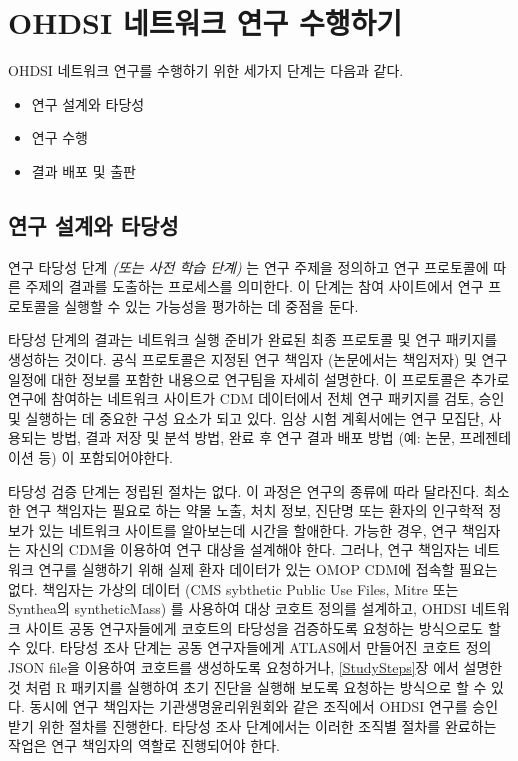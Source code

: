 \documentclass[11pt]{book}
\providecommand{\tightlist}{%
  \setlength{\itemsep}{0pt}\setlength{\parskip}{0pt}}
\theoremstyle{definition}
\theoremstyle{definition}
\theoremstyle{definition}
\theoremstyle{remark}
\begin{document}
\section{OHDSI 네트워크 연구 수행하기}\label{ohdsi---}


OHDSI 네트워크 연구를 수행하기 위한 세가지 단계는 다음과 같다.

\begin{itemize}
\tightlist
\item
  연구 설계와 타당성
\item
  연구 수행
\item
  결과 배포 및 출판
\end{itemize}

\subsection{연구 설계와 타당성}\label{--}

연구 타당성 단계 \emph{(또는 사전 학습 단계)} 는 연구 주제을 정의하고
연구 프로토콜에 따른 주제의 결과를 도출하는 프로세스를 의미한다. 이
단계는 참여 사이트에서 연구 프로토콜을 실행할 수 있는 가능성을 평가하는
데 중점을 둔다.

타당성 단계의 결과는 네트워크 실행 준비가 완료된 최종 프로토콜 및 연구
패키지를 생성하는 것이다. 공식 프로토콜은 지정된 연구 책임자 (논문에서는
책임저자) 및 연구 일정에 대한 정보를 포함한 내용으로 연구팀을 자세히
설명한다. 이 프로토콜은 추가로 연구에 참여하는 네트워크 사이트가 CDM
데이터에서 전체 연구 패키지를 검토, 승인 및 실행하는 데 중요한 구성
요소가 되고 있다. 임상 시험 계획서에는 연구 모집단, 사용되는 방법, 결과
저장 및 분석 방법, 완료 후 연구 결과 배포 방법 (예: 논문, 프레젠테이션
등) 이 포함되어야한다.

타당성 검증 단계는 정립된 절차는 없다. 이 과정은 연구의 종류에 따라
달라진다. 최소한 연구 책임자는 필요로 하는 약물 노출, 처치 정보, 진단명
또는 환자의 인구학적 정보가 있는 네트워크 사이트를 알아보는데 시간을
할애한다. 가능한 경우, 연구 책임자는 자신의 CDM을 이용하여 연구 대상을
설계해야 한다. 그러나, 연구 책임자는 네트워크 연구를 실행하기 위해 실제
환자 데이터가 있는 OMOP CDM에 접속할 필요는 없다. 책임자는 가상의 데이터
(CMS sybthetic Public Use Files, Mitre 또는 Synthea의 syntheticMass) 를
사용하여 대상 코호트 정의를 설계하고, OHDSI 네트워크 사이트 공동
연구자들에게 코호트의 타당성을 검증하도록 요청하는 방식으로도 할 수
있다. 타당성 조사 단계는 공동 연구자들에게 ATLAS에서 만들어진 코호트
정의 JSON file을 이용하여 코호트를 생성하도록 요청하거나,
\ref{StudySteps}장 에서 설명한 것 처럼 R 패키지를 실행하여 초기 진단을
실행해 보도록 요청하는 방식으로 할 수 있다. 동시에 연구 책임자는
기관생명윤리위원회와 같은 조직에서 OHDSI 연구를 승인 받기 위한 절차를
진행한다. 타당성 조사 단계에서는 이러한 조직별 절차를 완료하는 작업은
연구 책임자의 역할로 진행되어야 한다.
\end{document}
